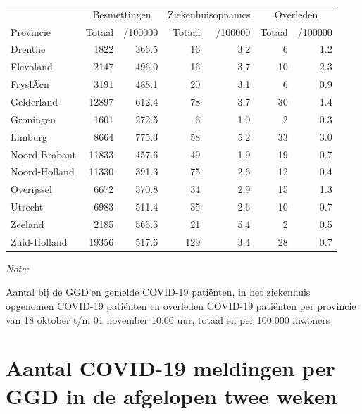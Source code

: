 \documentclass[
  english,
  man,floatsintext]{apa6}
\begin{document}
\begin{table}
\centering
\begin{threeparttable}
\begin{tabular}{lrrrrrr}
\toprule
\multicolumn{1}{c}{ } & \multicolumn{2}{c}{Besmettingen} & \multicolumn{2}{c}{Ziekenhuisopnames} & \multicolumn{2}{c}{Overleden} \\
\cmidrule(l{3pt}r{3pt}){2-3} \cmidrule(l{3pt}r{3pt}){4-5} \cmidrule(l{3pt}r{3pt}){6-7}
Provincie & Totaal & /100000 & Totaal & /100000 & Totaal & /100000\\
\midrule
Drenthe & 1822 & 366.5 & 16 & 3.2 & 6 & 1.2\\
Flevoland & 2147 & 496.0 & 16 & 3.7 & 10 & 2.3\\
FryslÃ¢n & 3191 & 488.1 & 20 & 3.1 & 6 & 0.9\\
Gelderland & 12897 & 612.4 & 78 & 3.7 & 30 & 1.4\\
Groningen & 1601 & 272.5 & 6 & 1.0 & 2 & 0.3\\
Limburg & 8664 & 775.3 & 58 & 5.2 & 33 & 3.0\\
Noord-Brabant & 11833 & 457.6 & 49 & 1.9 & 19 & 0.7\\
Noord-Holland & 11330 & 391.3 & 75 & 2.6 & 12 & 0.4\\
Overijssel & 6672 & 570.8 & 34 & 2.9 & 15 & 1.3\\
Utrecht & 6983 & 511.4 & 35 & 2.6 & 10 & 0.7\\
Zeeland & 2185 & 565.5 & 21 & 5.4 & 2 & 0.5\\
Zuid-Holland & 19356 & 517.6 & 129 & 3.4 & 28 & 0.7\\
\bottomrule
\end{tabular}
\begin{tablenotes}
\item \textit{Note: } 
\item Aantal bij de GGD’en gemelde COVID-19 patiënten, in het ziekenhuis opgenomen COVID-19 patiënten en overleden COVID-19 patiënten per provincie van 18 oktober t/m 01 november 10:00 uur, totaal en per 100.000 inwoners
\end{tablenotes}
\end{threeparttable}
\end{table}

\newpage

\hypertarget{aantal-covid-19-meldingen-per-ggd-in-de-afgelopen-twee-weken}{%
\section{Aantal COVID-19 meldingen per GGD in de afgelopen twee weken}\label{aantal-covid-19-meldingen-per-ggd-in-de-afgelopen-twee-weken}}
\end{document}
